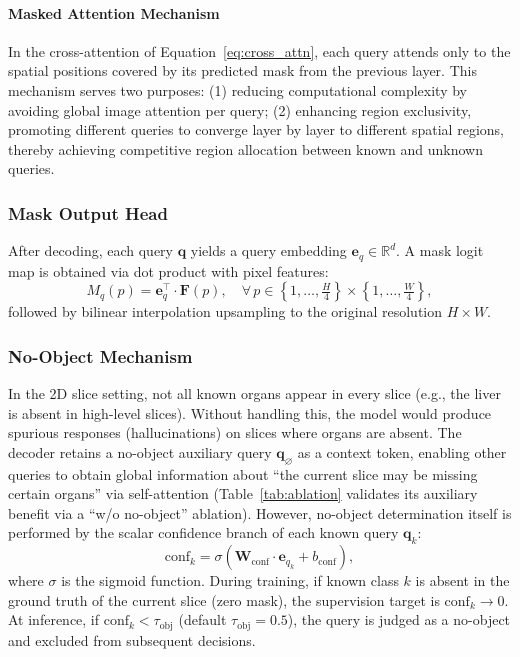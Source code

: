 \documentclass[3p,twocolumn,authoryear]{elsarticle}
\newcommand{\R}{\mathbb{R}}                              %
\newcommand{\bF}{\mathbf{F}}                              %
\newcommand{\bq}{\mathbf{q}}                              %
\newcommand{\tobj}{\tau_{\text{obj}}}                     %
\begin{document}
\paragraph{Masked Attention Mechanism}
In the cross-attention of Equation~\eqref{eq:cross_attn}, each query attends only
to the spatial positions covered by its predicted mask from the previous layer.
This mechanism serves two purposes:
(1) reducing computational complexity by avoiding global image attention per query;
(2) enhancing region exclusivity, promoting different queries to converge layer by layer
to different spatial regions, thereby achieving competitive region allocation between
known and unknown queries.

\subsubsection{Mask Output Head}\label{sec:method:parser:mask}

After decoding, each query $\bq$ yields a query embedding $\mathbf{e}_q \in \R^d$.
A mask logit map is obtained via dot product with pixel features:
\begin{equation}\label{eq:mask_logit}
  M_q(p) = \mathbf{e}_q^\top \cdot \bF(p), \quad \forall\, p \in \left\{1, \ldots, \tfrac{H}{4}\right\} \times \left\{1, \ldots, \tfrac{W}{4}\right\},
\end{equation}
followed by bilinear interpolation upsampling to the original resolution $H \times W$.

\subsubsection{No-Object Mechanism}\label{sec:method:parser:noobj}

In the 2D slice setting, not all known organs appear in every slice (e.g., the liver
is absent in high-level slices).
Without handling this, the model would produce spurious responses (hallucinations) on
slices where organs are absent.
The decoder retains a no-object auxiliary query $\bq_{\varnothing}$ as a context token,
enabling other queries to obtain global information about ``the current slice may be
missing certain organs'' via self-attention
(Table~\ref{tab:ablation} validates its auxiliary benefit via a ``w/o no-object''
ablation).
However, no-object determination itself is performed by the scalar confidence branch
of each known query $\bq_k$:
\begin{equation}\label{eq:conf}
  \text{conf}_k = \sigma\!\left(\mathbf{W}_{\text{conf}} \cdot \mathbf{e}_{q_k} + b_{\text{conf}}\right),
\end{equation}
where $\sigma$ is the sigmoid function.
During training, if known class $k$ is absent in the ground truth of the current slice
(zero mask), the supervision target is $\text{conf}_k \to 0$.
At inference, if $\text{conf}_k < \tobj$ (default $\tobj = 0.5$), the query is
judged as a no-object and excluded from subsequent decisions.
\end{document}
